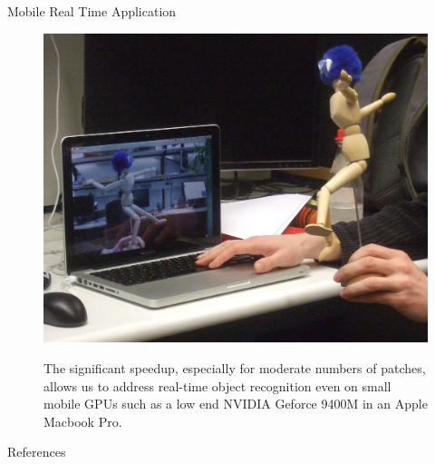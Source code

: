 \documentclass[final]{beamer}
\begin{document}
\begin{frame}{}
\begin{columns}[t]
\begin{column}{.48\linewidth}
\begin{block}{Mobile Real Time Application}
					\begin{figure}[htb]
					  \centering
					    \includegraphics[width=.6666\linewidth]{images/HS_2010-03-15_225559} \\
					  \caption{ The significant speedup, especially for moderate numbers of patches, allows us to address real-time object recognition even on small mobile GPUs such as a low end NVIDIA Geforce 9400M in an Apple Macbook Pro. }
					  \label{fig:performance}
					\end{figure}
        \end{block}
        
        \begin{block}{References}
        \tiny
	
	
	\end{block}
	
	
	
       \end{column}
    \end{columns}
  \end{frame}
\end{document}
